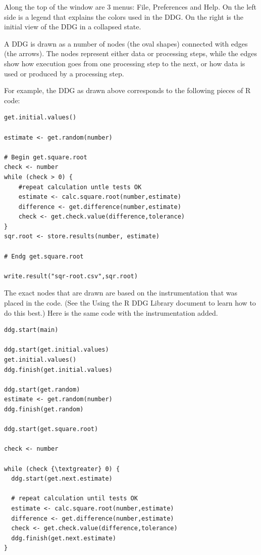 \documentclass[12pt]{article}
\begin{document}
{{\mdseries\upshape\color{black}
Along the top of the window are 3 menus: File, Preferences and Help. On the left side is a legend that explains the colors used in the DDG. On the right is the initial view of the DDG in a collapsed state.}

{\mdseries\upshape\color{black}
A DDG is drawn as a number of nodes (the oval shapes) connected with edges (the arrows). The nodes represent either data or processing steps, while the edges show how execution goes from one processing step to the next, or how data is used or produced by a processing step.}

{\mdseries\upshape\color{black}
For example, the DDG as drawn above corresponds to the following pieces of R code:}

\begin{lstlisting}
get.initial.values()

estimate <- get.random(number)

# Begin get.square.root
check <- number
while (check > 0) {
	#repeat calculation untle tests OK
	estimate <- calc.square.root(number,estimate)
	difference <- get.difference(number,estimate)
	check <- get.check.value(difference,tolerance)
}
sqr.root <- store.results(number, estimate)

# Endg get.square.root

write.result("sqr-root.csv",sqr.root)
\end{lstlisting}

\bigskip

{\mdseries\upshape\color{black}
The exact nodes that are drawn are based on the instrumentation that was placed in the code. (See the Using the R DDG Library document to learn how to do this best.) Here is the same code with the instrumentation added.}

\begin{lstlisting}
ddg.start(main)

ddg.start(get.initial.values)
get.initial.values()
ddg.finish(get.initial.values)

ddg.start(get.random)
estimate <- get.random(number)
ddg.finish(get.random)

ddg.start(get.square.root)

check <- number

while (check {\textgreater} 0) {
  ddg.start(get.next.estimate)

  # repeat calculation until tests OK
  estimate <- calc.square.root(number,estimate)
  difference <- get.difference(number,estimate)
  check <- get.check.value(difference,tolerance)
  ddg.finish(get.next.estimate)
}


\end{lstlisting}}
\end{document}
